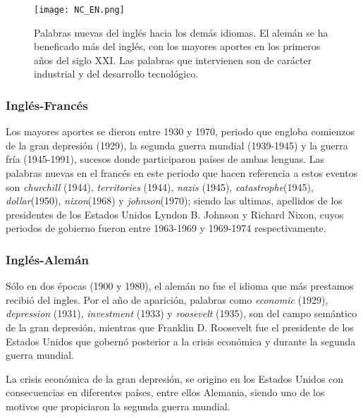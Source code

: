 \begin{figure} %
	\centering
	\texttt{[image: NC\_EN.png]}
	\label{fig.NC_EN}
	\caption{Palabras nuevas del inglés hacia los demás idiomas. El alemán se ha beneficado más del inglés, con los mayores aportes en los primeros años del siglo XXI. Las palabras que intervienen son de carácter industrial y del desarrollo tecnológico.}
\end{figure} %


\subsubsection*{Inglés-Francés} %

Los mayores aportes se dieron entre 1930 y 1970, periodo que engloba comienzos de
la gran depresión (1929), la segunda guerra mundial (1939-1945) y la guerra fría (1945-1991), sucesos donde participaron países de ambas lenguas. Las palabras nuevas en el francés en este periodo que hacen referencia a estos eventos son \textit{churchill} (1944), \textit{territories} (1944), \textit{nazis} (1945), \textit{catastrophe}(1945), \textit{dollar}(1950), \textit{nixon}(1968) y \textit{johnson}(1970); siendo las ultimas,  apellidos de los presidentes de los Estados Unidos  Lyndon B. Johnson y Richard Nixon, cuyos periodos de gobierno fueron  entre 1963-1969 y 1969-1974 respectivamente.

\subsubsection*{Inglés-Alemán} %

Sólo  en dos épocas (1900  y 1980), el alemán no fue el idioma que más prestamos recibió  del ingles. Por el año de aparición, palabras como \textit{economic} (1929), \textit{depression} (1931), \textit{investment} (1933) y \textit{roosevelt} (1935), son del campo semántico de la gran depresión,  mientras que  Franklin D. Roosevelt fue el presidente de los Estados Unidos que gobernó posterior a la crisis económica y durante la segunda guerra mundial. 

La crisis económica de la gran depresión, se origino en los Estados Unidos con consecuencias en diferentes países, entre ellos  Alemania, siendo uno de los motivos que propiciaron la segunda guerra mundial.

